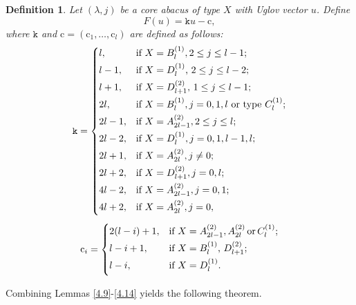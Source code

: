 \documentclass[11pt]{amsart}
\theoremstyle{plain}
\numberwithin{equation}{subsection}
\newtheorem{definition}[theorem]{Definition}
\newcommand{\lam}{\lambda}
\begin{document}
\begin{definition}\label{4.15}
Let $(\lam, j)$ be a core abacus of type $X$ with Uglov vector $u$. Define 
$$F(u)=\mathtt{k} u-\mathrm{c},$$ where $\mathtt{k}$ and $\mathrm{c}=(\mathrm{c}_1, \dots, \mathrm{c}_l)$ are defined as follows:
$$\mathtt{k}=\begin{cases}
\smallskip
l, &\text{\rm if $X=B_l^{(1)}, 2\leq j\leq l-1$};\\
\smallskip
l-1, &\text{{\rm if} $X=D_l^{(1)}$, $2\leq j\leq l-2$};\\
\smallskip
l+1, &\text{{\rm if} $X=D_{l+1}^{(2)}$, $1\leq j\leq l-1$};\\
\smallskip
2l, &\text{{\rm if} $X=B_l^{(1)}, j=0, 1, l$ {\rm or type} $C_l^{(1)}$};\\
\smallskip
2l-1, &\text{{\rm if} $X=A_{2l-1}^{(2)}, 2\leq j\leq l$};\\
\smallskip
2l-2, &\text{{\rm if} $X=D_l^{(1)}, j=0,1, l-1, l$};\\
\smallskip
2l+1, &\text{{\rm if} $X=A_{2l}^{(2)}, j\neq 0$};\\
\smallskip
2l+2, &\text{{\rm if} $X=D_{l+1}^{(2)}, j=0, l$};\\
\smallskip
4l-2, &\text{{\rm if} $X=A_{2l-1}^{(2)}, j=0, 1$};\\
\smallskip
4l+2, &\text{{\rm if} $X=A_{2l}^{(2)}, j=0$},\\
\end{cases}$$
$$\mathrm{c}_i=\begin{cases}
\smallskip
2(l-i)+1, &\text{{\rm if} $X=A_{2l-1}^{(2)}, A_{2l}^{(2)} \,{\rm or}\, C_l^{(1)}$};\\
\smallskip
l-i+1, &\text{{\rm if} $X=B_l^{(1)}$, $D_{l+1}^{(2)}$};\\
\smallskip
l-i, &\text{{\rm if} $X=D_l^{(1)}$}.\\
\end{cases}$$
\end{definition}

Combining Lemmas \ref{4.9}-\ref{4.14} yields the following theorem.
\end{document}
